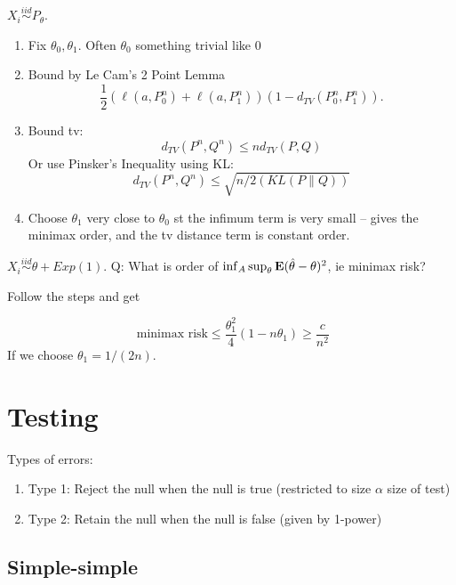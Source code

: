 \documentclass{article}
\newcommand{\simiid}{\overset{iid}\sim }
\begin{document}
\begin{recipe}
$X_i \simiid P_\theta$. 
\begin{enumerate}
	\item Fix $\theta_0, \theta_1$. Often $\theta_0$ something trivial like $0$
	\item Bound by Le Cam's 2 Point Lemma
	$$\frac{1}{2}  (\ell(a,P_0^n) + \ell(a,P_1^n)) (1-d_{TV} (P_0^n,P_1^n)).$$
	\item Bound tv:
	$$d_{TV} (P^n, Q^n) \leq n d_{TV} (P,Q)$$
	Or use Pinsker's Inequality using KL:
	$$d_{TV} (P^n, Q^n) \leq \sqrt{ n/2 (KL(P\| Q))}$$
	\item Choose $\theta_1$ very close to $\theta_0$ st the infimum term is very small -- gives the minimax order, and the tv distance term is constant order. 
\end{enumerate}
\end{recipe}
\begin{example}
$X_i \simiid \theta + Exp(1)$. Q: What is order of $\inf_A \sup_\theta \mathbf{E} (\hat \theta - \theta)^2$, ie minimax risk? 

Follow the steps and get 

$$\text{ minimax risk} \leq \frac{\theta_1^2}{4} (1-n\theta_1) \geq \frac{c}{n^2}$$
If we choose $\theta_1 = 1/(2n)$. 


\end{example}
\newpage
\section{Testing}
Types of errors:
\begin{enumerate}
	\item Type 1: Reject the null when the null is true (restricted to size $\alpha$ size of test)
	\item Type 2: Retain the null when the null is false (given by 1-power)
\end{enumerate}
\subsection{Simple-simple}
\end{document}
